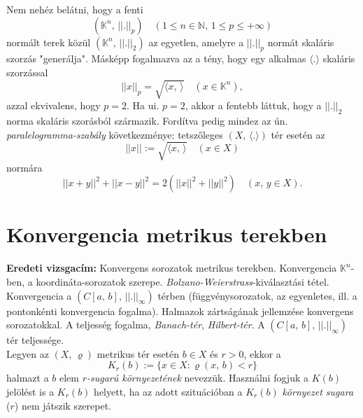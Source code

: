 \documentclass[12pt]{article}
\newcommand{\N}{\mathbb{N}}
\newcommand{\K}{\mathbb{K}}
\begin{document}
    Nem nehéz belátni, hogy a fenti
    \[
        (\K^n, \, ||.||_p) \quad (1 \leq n \in \N, \, 1 \leq p \leq + \infty)
    \]
    normált terek közül $(\K^n, \, ||.||_2)$ az egyetlen, amelyre a $||.||_p$ normát skaláris szorzás "generálja". Másképp fogalmazva az a tény, hogy egy alkalmas $\langle . \rangle$ skaláris szorzással
    \[
        ||x||_p = \sqrt{\langle x, \, \rangle} \quad (x \in \K^n),
    \]
    azzal ekvivalens, hogy $p=2$. Ha ui. $p=2$, akkor a fentebb láttuk, hogy a $||.||_2$ norma skaláris szorásból származik. Fordítva pedig mindez az ún. \textit{paralelogramma-szabály} következménye: tetszőleges $(X, \, \langle . \rangle)$ tér esetén az
    \[
        ||x|| := \sqrt{\langle x, \, \rangle} \quad (x \in X)
    \]
    normára
    \[
        ||x+y||^2 + ||x-y||^2 = 2(||x||^2 + ||y||^2) \quad (x, \, y \in X).
    \]
    \newpage
    

    \section{Konvergencia metrikus terekben}
    \textbf{Eredeti vizsgacím:} Konvergens sorozatok metrikus terekben. Konvergencia $\K^n$-ben, a koordináta-sorozatok szerepe. \textit{Bolzano-Weierstrass}-kiválasztási tétel. Konvergencia a $(C[a, \, b], \, ||.||_\infty)$ térben (függvénysorozatok, az egyenletes, ill. a pontonkénti konvergencia fogalma). Halmazok zártságának jellemzése konvergens sorozatokkal. A  teljesség fogalma, \textit{Banach-tér}, \textit{Hilbert-tér}. A $(C[a, \, b], \, ||.||_\infty)$ tér teljessége.\\

    Legyen az $(X, \, \varrho)$ metrikus tér esetén $b \in X$ és $r > 0$, ekkor a
    \[
        K_r(b) := \{ x \in X : \varrho(x, \, b) < r \}
    \]
    halmazt a $b$ elem $r$\textit{-sugarú környezetének} nevezzük. Használni fogjuk a $K(b)$ jelölést is a $K_r(b)$ helyett, ha az adott szituációban a $K_r(b)$ \textit{környezet sugara} ($r$) nem játszik szerepet.\\
\end{document}
